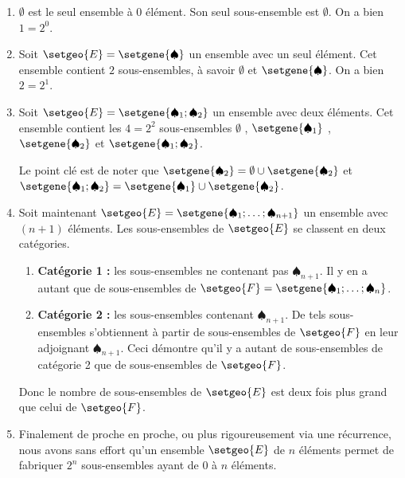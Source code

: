 \documentclass[12pt]{amsart}
\begin{document}
\begin{enumerate}
	\medskip
	\item $\emptyset$ est le seul ensemble à $0$ élément. Son seul sous-ensemble est $\emptyset$. On a bien $1 = 2^0$.


	\medskip
	\item Soit $\setgeo{E} = \setgene{\spadesuit}$ un ensemble avec un seul élément. Cet ensemble contient $2$ sous-ensembles, à savoir $\emptyset$ et $\setgene{\spadesuit}$. On a bien $2 = 2^1$.


	\medskip
	\item Soit $\setgeo{E} = \setgene{\spadesuit_1 ; \spadesuit_2}$ un ensemble avec deux éléments.
	      Cet ensemble contient les $4 = 2^2$ sous-ensembles
	      $\emptyset$ , $\setgene{\spadesuit_1}$ ,
	      $\setgene{\spadesuit_2}$ et $\setgene{\spadesuit_1 ; \spadesuit_2}$.
	
	      \noindent
	      Le point clé est de noter que
	      $\setgene{\spadesuit_2} = \emptyset \cup \setgene{\spadesuit_2}$ et
	      $\setgene{\spadesuit_1 ; \spadesuit_2} = \setgene{\spadesuit_1} \cup \setgene{\spadesuit_2}$.

	\medskip
	\item Soit maintenant $\setgeo{E} = \setgene{\spadesuit_1 ; \dots ; \spadesuit_{n+1}}$ un ensemble avec $(n+1)$ éléments.
		  Les sous-ensembles de $\setgeo{E}$ se classent en deux catégories.
		  
		  \begin{enumerate}
		  		\smallskip
				\item \textbf{Catégorie 1 :} les sous-ensembles ne contenant pas $\spadesuit_{n+1}$.
				      Il y en a autant que de sous-ensembles de $\setgeo{F} = \setgene{\spadesuit_1 ; \dots ; \spadesuit_{n}}$.
		  		
				\smallskip
				\item \textbf{Catégorie 2 :} les sous-ensembles contenant $\spadesuit_{n+1}$.
				      De tels sous-ensembles s'obtiennent à partir de sous-ensembles de $\setgeo{F}$ en leur adjoignant $\spadesuit_{n+1}$.
				      Ceci démontre qu'il y a autant de sous-ensembles de catégorie 2 que de sous-ensembles de $\setgeo{F}$.
		  \end{enumerate}

		  \noindent
		  Donc le nombre de sous-ensembles de $\setgeo{E}$ est deux fois plus grand que celui de $\setgeo{F}$.


	\medskip
	\item Finalement de proche en proche, ou plus rigoureusement via une récurrence, nous avons sans effort qu'un ensemble $\setgeo{E}$ de $n$ éléments permet de fabriquer $2^n$ sous-ensembles ayant de $0$ à $n$ éléments.
\end{enumerate}
\end{document}
